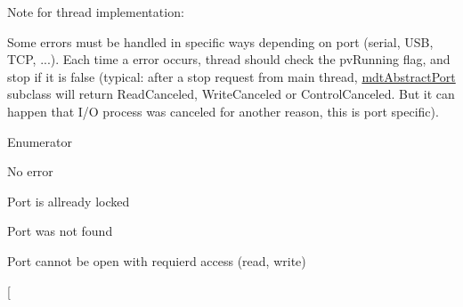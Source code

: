 Note for thread implementation\-:\par
 Some errors must be handled in specific ways depending on port (serial, U\-S\-B, T\-C\-P, ...). Each time a error occurs, thread should check the pv\-Running flag, and stop if it is false (typical\-: after a stop request from main thread, \hyperlink{classmdt_abstract_port}{mdt\-Abstract\-Port} subclass will return Read\-Canceled, Write\-Canceled or Control\-Canceled. But it can happen that I/\-O process was canceled for another reason, this is port specific). \begin{Desc}
\item[Enumerator]\par
\begin{description}
\item[{\em 
\hypertarget{classmdt_abstract_port_ad4121bb930c95887e77f8bafa065a85eab898bd273effe5cb4ed1a399a2d4baad}{No\-Error}\label{classmdt_abstract_port_ad4121bb930c95887e77f8bafa065a85eab898bd273effe5cb4ed1a399a2d4baad}
}]No error \item[{\em 
\hypertarget{classmdt_abstract_port_ad4121bb930c95887e77f8bafa065a85eaedd63daf0db75794bb8e8e467da9575c}{Port\-Locked}\label{classmdt_abstract_port_ad4121bb930c95887e77f8bafa065a85eaedd63daf0db75794bb8e8e467da9575c}
}]Port is allready locked \item[{\em 
\hypertarget{classmdt_abstract_port_ad4121bb930c95887e77f8bafa065a85ea54a896ba3ff98896390e87bfe1f29eb0}{Port\-Not\-Found}\label{classmdt_abstract_port_ad4121bb930c95887e77f8bafa065a85ea54a896ba3ff98896390e87bfe1f29eb0}
}]Port was not found \item[{\em 
\hypertarget{classmdt_abstract_port_ad4121bb930c95887e77f8bafa065a85eaee5a84e59e9dc5fcf27cac57068bb1f4}{Port\-Access}\label{classmdt_abstract_port_ad4121bb930c95887e77f8bafa065a85eaee5a84e59e9dc5fcf27cac57068bb1f4}
}]Port cannot be open with requierd access (read, write) \item[{\em 
}
\end{description}
\end{Desc}
